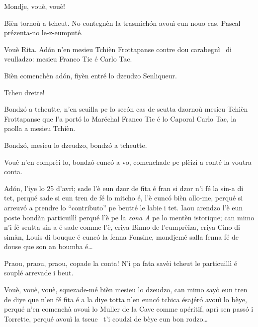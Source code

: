 \begin{drama}

 
\Ritaspeaks Mondje, vouè, vouè!


\Ritaspeaks Bièn tornoù a tcheut. No contegnèn la trasmichón avouì eun nouo cas. Pascal prézenta-no le-z-eumputé.

\Pascalspeaks Vouè Rita. Adón n'en mesieu Tchièn Frottapanse contre dou carabegnì \carabiniere\ di veulladzo: mesieu Franco Tic é Carlo Tac.


\Ritaspeaks Bièn comenchèn adón, fiyèn entré lo dzeudzo Senliqueur.


\Pascalspeaks Tcheu drette!


\DzeudzoSenliquerspeaks Bondzó a tcheutte, n'en seuilla pe lo secón cas de seutta dzornoù mesieu Tchièn Frottapanse que l'a portó lo Maréchal Franco Tic é lo Caporal Carlo Tac, la paolla a mesieu Tchièn.

\Cienspeaks Bondzó, mesieu lo dzeudzo, bondzó a tcheutte.

\DzeudzoSenliquerspeaks Voué n’en comprèi-lo, bondzó eunc\'o a vo, comenchade pe plèizì a conté la voutra conta.

\Cienspeaks Adón, l'iye lo 25 d’avrì; sade l'è eun dzor de fita é fran si dzor n’i fé la sin-a di tet, perqué sade si eun tren de fé lo mitcho é, l’è euncó bièn allo-me, perqué si arreuv\'o a prendre lo ``contributo'' pe beutté le labie i tet. Iaou arendzo l’è eun poste bondàn particuillì perqué l’è pe la \textit{zona A} pe lo mentèn istorique; can mimo n’i fé seutta sin-a é sade comme l’è, criya Binno de l'eumprèiza, criya Cino di simàn, Louis di bouque é euncó la fenna Fonsine, mondjemé salla fenna fé de douse que son an boumba é\ldots

\DzeudzoSenliquerspeaks {} Praou, praou, praou, copade la conta! N’i pa fata savèi tcheut le particuillì é souplé arrevade i beut.

\Cienspeaks Vouè, vouè, vouè, squezade-mé bièn mesieu lo dzeudzo, can mimo sayò eun tren de diye que n’en fé fita é a la diye totta n’en eunc\'o tchica ésajéró avouì lo bèye, perqué n’en comenchà avouì lo Muller de la Cave comme apéritif, aprì sen passó i Torrette, perqué avouì la tseue \carne\ t’i coudzì de bèye eun bon rodzo\ldots


\end{drama}
